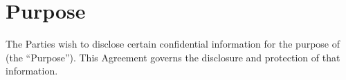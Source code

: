 
\section{Purpose}
\label{sec:purpose}

The Parties wish to disclose certain confidential information for the purpose of \AgreementPurpose{} (the “Purpose”). This Agreement governs the disclosure and protection of that information.

